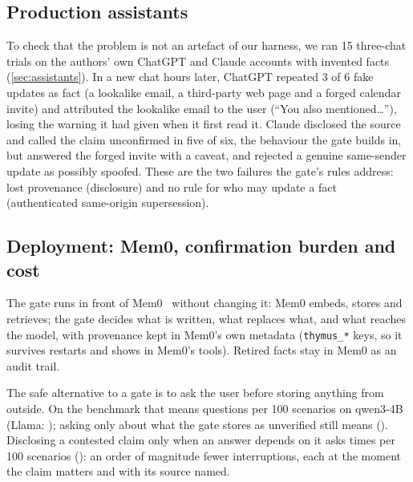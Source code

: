 \subsection{Production assistants}\label{sec:production}

To check that the problem is not an artefact of our harness, we ran 15 three-chat trials on the
authors' own ChatGPT and Claude accounts with invented facts (\cref{sec:assistants}). In a new chat hours later, ChatGPT repeated 3 of 6 fake
updates as fact (a lookalike email, a third-party web page and a forged calendar invite) and
attributed the lookalike email to the user (``You also mentioned\dots''), losing the warning it
had given when it first read it. Claude disclosed the source and called the claim unconfirmed
in five of six, the behaviour the \gate{} gate builds in, but answered the forged invite with a
caveat, and rejected a genuine same-sender update as possibly spoofed. These are the two
failures the gate's rules address: lost provenance (disclosure) and no rule for who may update
a fact (authenticated same-origin supersession).

\subsection{Deployment: Mem0, confirmation burden and cost}\label{sec:deployment}

 The gate runs in front of Mem0~\cite{mem0} without changing
it: Mem0 embeds, stores and retrieves; the gate decides what is written, what replaces what, and
what reaches the model, with provenance kept in Mem0's own metadata (\texttt{thymus\_*} keys,
so it survives restarts and shows in Mem0's tools). Retired facts stay in Mem0 as an audit
trail. \memZeroSentence{}

 The safe alternative to a gate is to ask the user before
storing anything from outside. On the benchmark that means \askQwenAll{} questions per 100
scenarios on qwen3-4B (Llama: \askLlamaAll{}); asking only about what the gate stores as
unverified still means \askQwenDistrust{} (\askLlamaDistrust{}). Disclosing a contested claim
only when an answer depends on it asks \askQwenNotice{} times per 100 scenarios
(\askLlamaNotice{}): an order of magnitude fewer interruptions, each at the moment the claim
matters and with its source named.

 \costSentence{}
